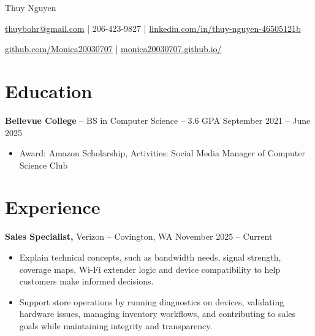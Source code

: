 \documentclass[11pt]{article}       %
\begin{document}
\centerline{\Huge Thuy Nguyen}

\vspace{5pt}

\centerline{\href{mailto:thuybohr@gmail.com}{thuybohr@gmail.com} | 206-423-9827 |
\href{https://www.linkedin.com/in/thuy-nguyen-46505121b/}{linkedin.com/in/thuy-nguyen-46505121b}}

\centerline{\href{https://github.com/Monica20030707}{github.com/Monica20030707} | 
\href{https://monica20030707.github.io/}{monica20030707.github.io/}} 

\vspace{-9pt}

\section*{Education}
\textbf{Bellevue College} -- BS in Computer Science -- 3.6 GPA \hfill September 2021 -- June 2025\\
\vspace{-9pt}
\begin{itemize}
  \item Award: Amazon Scholarship, Activities: Social Media Manager of Computer Science Club
\end{itemize}

\vspace{-18.5pt}

\section*{Experience}

\textbf{Sales Specialist,} {Verizon} -- Covington, WA \hfill November 2025 -- Current \\
\vspace{-9pt}
\begin{itemize}
  \item Explain technical concepts, such as bandwidth needs, signal strength, coverage maps, Wi-Fi extender logic and device compatibility to help customers make informed decisions.
  \item Support store operations by running diagnostics on devices, validating hardware issues, managing inventory workflows, and contributing to sales goals while maintaining integrity and transparency.
\end{itemize}
\end{document}

